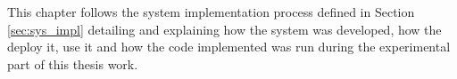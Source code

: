 This chapter follows the system implementation process defined in Section \ref{sec:sys_impl} detailing and explaining how the system was developed, how the deploy it, use it and how the code implemented was run during the experimental part of this thesis work.